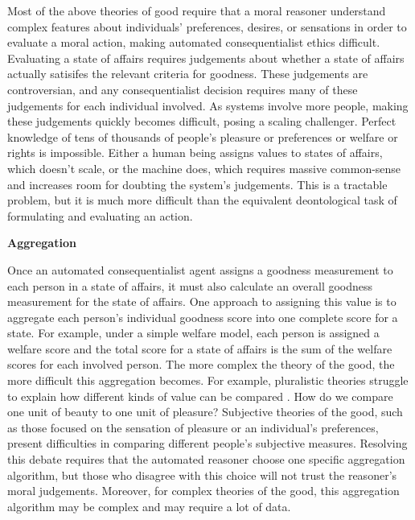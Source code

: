 \begin{isabellebody}
\begin{isamarkuptext}
Most of the above theories of good require that a moral reasoner understand complex features about
individuals' preferences, desires, or sensations in order to evaluate a moral action, making automated
consequentialist ethics difficult. Evaluating a state of affairs requires
judgements about whether a state of affairs actually satisifes the relevant criteria for goodness. 
These judgements are controversian, and any consequentialist decision requires many of 
these judgements for each individual involved. As systems involve more people, making these judgements 
quickly becomes difficult, posing a scaling challenger. Perfect knowledge of tens of thousands of 
people's pleasure or preferences or welfare or rights is impossible. Either a human being 
assigns values to states of affairs, which doesn't scale, or the machine does, 
which requires massive common-sense and increases room for doubting the system's judgements. This is 
a tractable problem, but it is much more difficult than the equivalent deontological task of formulating
and evaluating an action.%
\end{isamarkuptext}\isamarkuptrue%
%
\begin{isamarkuptext}%
\noindent \textbf{Aggregation}%
\end{isamarkuptext}\isamarkuptrue%
%
\begin{isamarkuptext}%
Once an automated consequentialist agent assigns a goodness measurement to each person in a state of affairs, it 
must also calculate an overall goodness measurement for the state of affairs. One approach to assigning
this value is to aggregate each person's individual goodness score into one complete score for a state. 
For example, under a simple welfare model, each person is assigned a welfare score and the total 
score for a state of affairs is the sum of the welfare scores for each involved person.
The more complex the theory of the good, the more difficult this aggregation becomes. For example, 
pluralistic theories struggle to explain how different kinds of value can be compared \citep{consequentialismsep}. 
How do we compare one unit of beauty to one unit of pleasure? Subjective theories of the good, such 
as those focused on the sensation of pleasure or an individual's preferences, present difficulties in 
comparing different people's subjective measures. Resolving this debate requires that the automated reasoner 
choose one specific aggregation algorithm, but those who disagree with this choice will not trust 
the reasoner's moral judgements. Moreover, for complex theories of the good, this aggregation algorithm
may be complex and may require a lot of data. 


\end{isamarkuptext}
\end{isabellebody}

